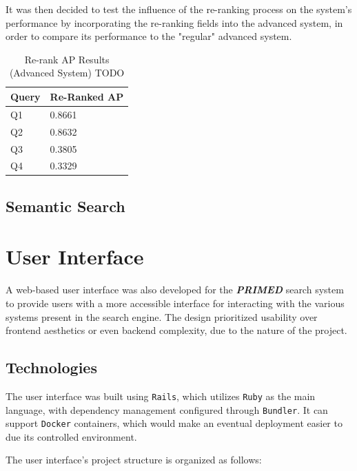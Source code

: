 \documentclass[sigconf]{acmart}
\begin{document}
It was then decided to test the influence of the re-ranking process on the system's performance by incorporating the re-ranking fields into the advanced system, in order to compare its performance to the "regular" advanced system.

\begin{table}[H]
	\begin{tabular}{ | m{5em} | m{1.5cm} | }
		\hline
		Query & Re-Ranked AP \\
		\hline
		Q1 & 0.8661 \\
		\hline
		Q2 & 0.8632 \\
		\hline
		Q3 & 0.3805 \\
		\hline
		Q4 & 0.3329 \\
		\hline
	\end{tabular}
	\caption{Re-rank AP Results (Advanced System) TODO}
	\label{tab:rerank_ap_results}
\end{table}

\subsection{Semantic Search}

\section{User Interface}

A web-based user interface was also developed for the \textit{\textbf{PRIMED}} search system to provide users with a more accessible interface for interacting with the various systems present in the search engine. The design prioritized usability over frontend aesthetics or even backend complexity, due to the nature of the project.

\subsection{Technologies} 

The user interface was built using \texttt{Rails}\cite{rails}, which utilizes \texttt{Ruby}\cite{ruby} as the main language, with dependency management configured through \texttt{Bundler}\cite{bundler}. It can support \texttt{Docker}\cite{docker} containers, which would make an eventual deployment easier to due its controlled environment.

The user interface's project structure is organized as follows:
\end{document}

